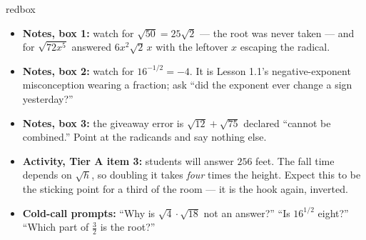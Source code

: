 \documentclass[10pt]{article}
\begin{document}
\begin{skillbox}{redbox}
\begin{itemize}[leftmargin=1.2em, itemsep=2pt, topsep=2pt]
  \item \textbf{Notes, box 1:} watch for $\sqrt{50}=25\sqrt2$ --- the root was never taken --- and
        for $\sqrt{72x^5}$ answered $6x^2\sqrt2\,x$ with the leftover $x$ escaping the radical.
  \item \textbf{Notes, box 2:} watch for $16^{-1/2}=-4$. It is Lesson 1.1's negative-exponent
        misconception wearing a fraction; ask ``did the exponent ever change a sign yesterday?''
  \item \textbf{Notes, box 3:} the giveaway error is $\sqrt{12}+\sqrt{75}$ declared ``cannot be
        combined.'' Point at the radicands and say nothing else.
  \item \textbf{Activity, Tier A item 3:} students will answer $256$ feet. The fall time depends
        on $\sqrt h$, so doubling it takes \emph{four} times the height. Expect this to be the
        sticking point for a third of the room --- it is the hook again, inverted.
  \item \textbf{Cold-call prompts:} ``Why is $\sqrt4\cdot\sqrt{18}$ not an answer?'' ``Is
        $16^{1/2}$ eight?'' ``Which part of $\tfrac32$ is the root?''
\end{itemize}
\end{skillbox}
\end{document}
